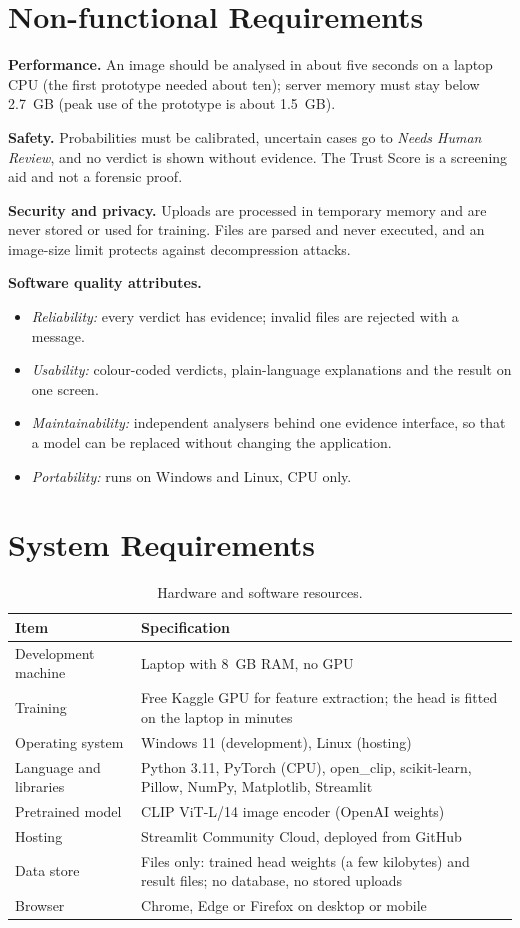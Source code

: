 \section{Non-functional Requirements}
\textbf{Performance.} An image should be analysed in about five seconds on a laptop CPU (the first prototype needed about ten); server memory must stay below 2.7~GB (peak use of the prototype is about 1.5~GB).

\textbf{Safety.} Probabilities must be calibrated, uncertain cases go to \emph{Needs Human Review}, and no verdict is shown without evidence. The Trust Score is a screening aid and not a forensic proof.

\textbf{Security and privacy.} Uploads are processed in temporary memory and are never stored or used for training. Files are parsed and never executed, and an image-size limit protects against decompression attacks.

\textbf{Software quality attributes.}
\begin{itemize}
  \item \emph{Reliability:} every verdict has evidence; invalid files are rejected with a message.
  \item \emph{Usability:} colour-coded verdicts, plain-language explanations and the result on one screen.
  \item \emph{Maintainability:} independent analysers behind one evidence interface, so that a model can be replaced without changing the application.
  \item \emph{Portability:} runs on Windows and Linux, CPU only.
\end{itemize}

\section{System Requirements}
\begin{table}[htbp]
\centering\small
\caption{Hardware and software resources.}
\begin{tabularx}{\linewidth}{@{}p{3.6cm}X@{}}
\toprule
Item & Specification\\
\midrule
Development machine & Laptop with 8~GB RAM, no GPU\\
Training & Free Kaggle GPU for feature extraction; the head is fitted on the laptop in minutes\\
Operating system & Windows 11 (development), Linux (hosting)\\
Language and libraries & Python 3.11, PyTorch (CPU), open\_clip, scikit-learn, Pillow, NumPy, Matplotlib, Streamlit\\
Pretrained model & CLIP ViT-L/14 image encoder (OpenAI weights)\\
Hosting & Streamlit Community Cloud, deployed from GitHub\\
Data store & Files only: trained head weights (a few kilobytes) and result files; no database, no stored uploads\\
Browser & Chrome, Edge or Firefox on desktop or mobile\\
\bottomrule
\end{tabularx}
\end{table}

